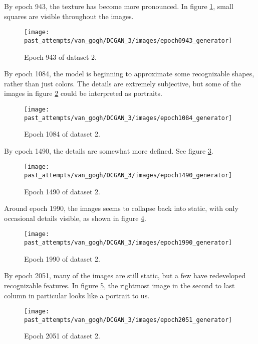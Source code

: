 \documentclass[11pt,letterpaper]{article}
\begin{document}
				By epoch 943, the texture has become more pronounced.
				In figure \ref{fig:cgvg:epoch0943generator}, small squares are visible throughout the images.
				\begin{figure}
					\centering
					\texttt{[image: past\_attempts/van\_gogh/DCGAN\_3/images/epoch0943\_generator]}
					\caption{Epoch 943 of dataset 2.}
					\label{fig:cgvg:epoch0943generator}
				\end{figure}

				By epoch 1084, the model is beginning to approximate some recognizable shapes, rather than just colors.
				The details are extremely subjective, but some of the images in figure \ref{fig:cgvg:epoch1084generator} could be interpreted as portraits.
				\begin{figure}
					\centering
					\texttt{[image: past\_attempts/van\_gogh/DCGAN\_3/images/epoch1084\_generator]}
					\caption{Epoch 1084 of dataset 2.}
					\label{fig:cgvg:epoch1084generator}
				\end{figure}

				By epoch 1490, the details are somewhat more defined.
				See figure \ref{fig:cgvg:epoch1490generator}.
				\begin{figure}
					\centering
					\texttt{[image: past\_attempts/van\_gogh/DCGAN\_3/images/epoch1490\_generator]}
					\caption{Epoch 1490 of dataset 2.}
					\label{fig:cgvg:epoch1490generator}
				\end{figure}

				Around epoch 1990, the images seems to collapse back into static, with only occasional details visible, as shown in figure \ref{fig:cgvg:epoch1990generator}.
				\begin{figure}
					\centering
					\texttt{[image: past\_attempts/van\_gogh/DCGAN\_3/images/epoch1990\_generator]}
					\caption{Epoch 1990 of dataset 2.}
					\label{fig:cgvg:epoch1990generator}
				\end{figure}

				By epoch 2051, many of the images are still static, but a few have redeveloped recognizable features.
				In figure \ref{fig:cgvg:epoch2051generator}, the rightmost image in the second to last column in particular looks like a portrait to us.
				\begin{figure}
					\centering
					\texttt{[image: past\_attempts/van\_gogh/DCGAN\_3/images/epoch2051\_generator]}
					\caption{Epoch 2051 of dataset 2.}
					\label{fig:cgvg:epoch2051generator}
				\end{figure}
\end{document}
